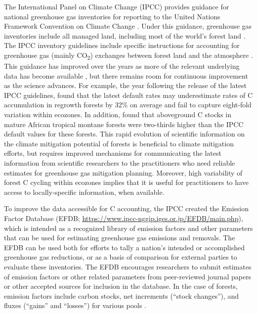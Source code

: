 \documentclass[, manuscript]{copernicus}
\begin{document}
The International Panel on Climate Change (IPCC) provides guidance for
national greenhouse gas inventories for reporting to the United Nations
Framework Convention on Climate Change
\citep[UNFCCC,][]{ipcc_2006_2006, ipcc_2019_2019}. Under this guidance,
greenhouse gas inventories include all managed land, including most of
the world's forest land \citep{ogle_delineating_2018}. The IPCC
inventory guidelines include specific instructions for accounting for
greenhouse gas (mainly CO\textsubscript{2}) exchanges between forest
land and the atmosphere \citep{ipcc_agriculture_2006, ipcc_2019_2019}.
This guidance has improved over the years as more of the relevant
underlying data has become available
\citep{requenasuarez_estimating_2019, rozendaal_aboveground_2022}, but
there remains room for continuous improvement as the science advances.
For example, the year following the release of the latest IPCC
guidelines, \citet{cook-patton_mapping_2020} found that the latest
default rates may underestimate rates of C accumulation in regrowth
forests by 32\% on average and fail to capture eight-fold variation
within ecozones. In addition, \citet{cuni-sanchez_high_2021} found that
aboveground C stocks in mature African tropical montane forests were
two-thirds higher than the IPCC default values for these forests. This
rapid evolution of scientific information on the climate mitigation
potential of forests is beneficial to climate mitigation efforts, but
requires improved mechanisms for communicating the latest information
from scientific researchers to the practitioners who need reliable
estimates for greenhouse gas mitigation planning. Moreover, high
variability of forest C cycling within ecozones
\citep[e.g.,][]{cook-patton_mapping_2020, cuni-sanchez_high_2021}
implies that it is useful for practitioners to have access to
locally-specific information, when available.

To improve the data accessible for C accounting, the IPCC created the
Emission Factor Database (EFDB;
\url{https://www.ipcc-nggip.iges.or.jp/EFDB/main.php}), which is
intended as a recognized library of emission factors and other
parameters that can be used for estimating greenhouse gas emissions and
removals. The EFDB can be used both for efforts to tally a nation's
intended or accomplished greenhouse gas reductions, or as a basis of
comparison for external parties to evaluate these inventories. The EFDB
encourages researchers to submit estimates of emission factors or other
related parameters from peer-reviewed journal papers or other accepted
sources for inclusion in the database. In the case of forests, emission
factors include carbon stocks, net increments (``stock changes''), and
fluxes (``gains'' and ``losses'') for various pools
\citep{ipcc_2006_2006, ipcc_2019_2019}.
\end{document}

